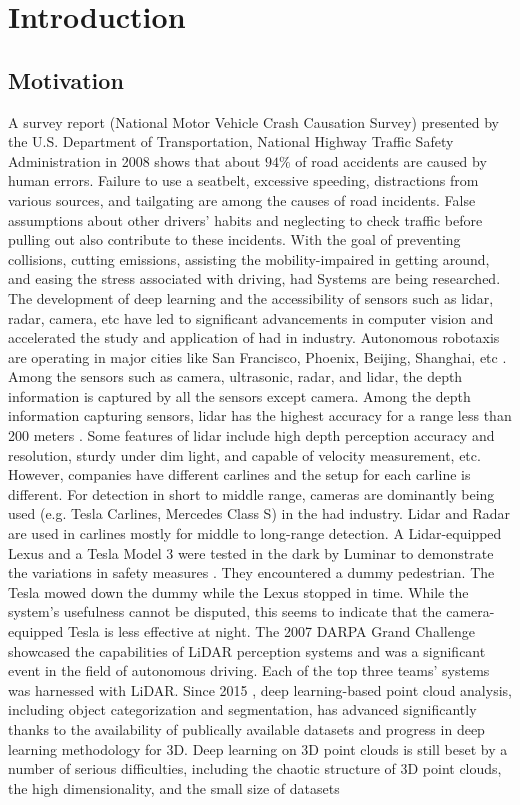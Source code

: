 \chapter{Introduction}

\section{Motivation}
A survey report (National Motor Vehicle Crash Causation Survey) presented by the  U.S. Department of
Transportation, National Highway Traffic Safety Administration in 2008 \parencite{nmvccs} shows that about \(94\%\) of road accidents are caused by human errors. Failure to use a seatbelt, excessive speeding, distractions from various sources, and tailgating are among the causes of road incidents. False assumptions about other drivers' habits and neglecting to check traffic before pulling out also contribute to these incidents. With the goal of preventing collisions, cutting emissions, assisting the mobility-impaired in getting around, and easing the stress associated with driving, \acrfull{had} Systems are being researched. The development of deep learning and the accessibility of sensors such as lidar, radar, camera, etc have led to significant advancements in computer vision and accelerated the study and application of \acrshort{had} in industry. Autonomous robotaxis are operating in major cities like San Francisco, Phoenix, Beijing, Shanghai, etc \parencite{robotaxis}. Among the sensors such as camera, ultrasonic, radar, and lidar, the depth information is captured by all the sensors except camera. Among the depth information capturing sensors, lidar has the highest accuracy for a range less than 200 meters \parencite{Yurtsever_2020}. Some features of lidar include high depth perception accuracy and resolution, sturdy under dim light, and capable of velocity measurement, etc. However, companies have different carlines and the setup for each carline is different. For detection in short to middle range, cameras are dominantly being used (e.g. Tesla Carlines, Mercedes Class S) in the \acrshort{had} industry. Lidar and Radar are used in carlines mostly for middle to long-range detection. A Lidar-equipped Lexus and a Tesla Model 3 were tested in the dark by Luminar to demonstrate the variations in safety measures \parencite{tesla_vs_lexus}. They encountered a dummy pedestrian. The Tesla mowed down the dummy while the Lexus stopped in time. While the system's usefulness cannot be disputed, this seems to indicate that the camera-equipped Tesla is less effective at night. The 2007 DARPA Grand Challenge showcased the capabilities of LiDAR perception systems and was a significant event in the field of autonomous driving. Each of the top three teams' systems was harnessed with LiDAR. Since 2015 \parencite{guo2020deep}, deep learning-based point cloud analysis, including object categorization and segmentation, has advanced significantly thanks to the availability of publically available datasets and progress in deep learning methodology for 3D. Deep learning on 3D point clouds is still beset by a number of serious difficulties, including the chaotic structure of 3D point clouds, the high dimensionality, and the small size of datasets 
